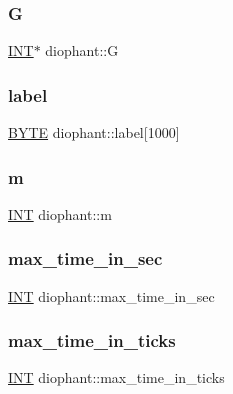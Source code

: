 \subsubsection{\texorpdfstring{G}{G}}
{\footnotesize\ttfamily \mbox{\hyperlink{galois_8h_a09fddde158a3a20bd2dcadb609de11dc}{I\+NT}}$\ast$ diophant\+::G}

\mbox{\label{classdiophant_a5f8790fdf02bf65c8c783948f46af3bb}} 
\subsubsection{\texorpdfstring{label}{label}}
{\footnotesize\ttfamily \mbox{\hyperlink{galois_8h_ab6cc7b4aeb6ea31aba2b3fbfc83ff5e6}{B\+Y\+TE}} diophant\+::label\mbox{[}1000\mbox{]}}

\mbox{\label{classdiophant_aa69645f9f75b13d51a58bdda260d9d50}} 
\subsubsection{\texorpdfstring{m}{m}}
{\footnotesize\ttfamily \mbox{\hyperlink{galois_8h_a09fddde158a3a20bd2dcadb609de11dc}{I\+NT}} diophant\+::m}

\mbox{\label{classdiophant_a4185c62d608c6fae84abe63cedee13b2}} 
\subsubsection{\texorpdfstring{max\+\_\+time\+\_\+in\+\_\+sec}{max\_time\_in\_sec}}
{\footnotesize\ttfamily \mbox{\hyperlink{galois_8h_a09fddde158a3a20bd2dcadb609de11dc}{I\+NT}} diophant\+::max\+\_\+time\+\_\+in\+\_\+sec}

\mbox{\label{classdiophant_a86c69d399265ce714eb1b2e6d53e5a04}} 
\subsubsection{\texorpdfstring{max\+\_\+time\+\_\+in\+\_\+ticks}{max\_time\_in\_ticks}}
{\footnotesize\ttfamily \mbox{\hyperlink{galois_8h_a09fddde158a3a20bd2dcadb609de11dc}{I\+NT}} diophant\+::max\+\_\+time\+\_\+in\+\_\+ticks}

